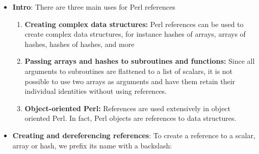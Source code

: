\documentclass{report}
\begin{document}
    \pagebreak 
    \begin{itemize}
        \item \textbf{Intro}: There are three main uses for Perl references        
            \begin{enumerate}
                \item \textbf{Creating complex data structures:} Perl references can be used to create complex data structures, for instance hashes of arrays, arrays of hashes, hashes of hashes, and more
                \item \textbf{Passing arrays and hashes to subroutines and functions:} Since all arguments to subroutines are flattened to a list of scalars, it is not possible to use two arrays as arguments and have them retain their individual identities without using references.
                \item \textbf{Object-oriented Perl:} References are used extensively in object oriented Perl. In fact, Perl objects are references to data structures.
            \end{enumerate}
        \item \textbf{Creating and dereferencing references}: To create a reference to a scalar, array or hash, we prefix its name with a backslash:
            \bigbreak \noindent 
\end{itemize}
\end{document}
